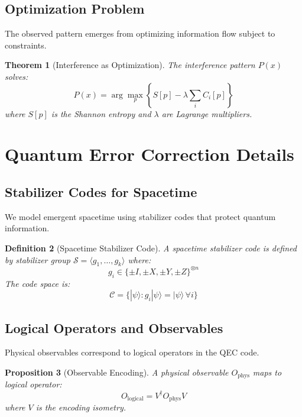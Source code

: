 \documentclass[12pt,a4paper]{article}
\newtheorem{theorem}{Theorem}[section]
\newtheorem{proposition}[theorem]{Proposition}
\newtheorem{definition}[theorem]{Definition}
\begin{document}
\subsection{Optimization Problem}

The observed pattern emerges from optimizing information flow subject to constraints.

\begin{theorem}[Interference as Optimization]
The interference pattern $P(x)$ solves:
\begin{equation}
P(x) = \arg\max_{p} \left\{S[p] - \lambda \sum_i C_i[p]\right\}
\end{equation}
where $S[p]$ is the Shannon entropy and $\lambda$ are Lagrange multipliers.
\end{theorem}

\section{Quantum Error Correction Details}

\subsection{Stabilizer Codes for Spacetime}

We model emergent spacetime using stabilizer codes that protect quantum information.

\begin{definition}[Spacetime Stabilizer Code]
A spacetime stabilizer code is defined by stabilizer group $\mathcal{S} = \langle g_1, \ldots, g_k \rangle$ where:
\begin{equation}
g_i \in \{\pm I, \pm X, \pm Y, \pm Z\}^{\otimes n}
\end{equation}
The code space is:
\begin{equation}
\mathcal{C} = \{|\psi\rangle : g_i|\psi\rangle = |\psi\rangle \, \forall i\}
\end{equation}
\end{definition}

\subsection{Logical Operators and Observables}

Physical observables correspond to logical operators in the QEC code.

\begin{proposition}[Observable Encoding]
A physical observable $O_{\text{phys}}$ maps to logical operator:
\begin{equation}
O_{\text{logical}} = V^\dagger O_{\text{phys}} V
\end{equation}
where $V$ is the encoding isometry.
\end{proposition}
\end{document}
